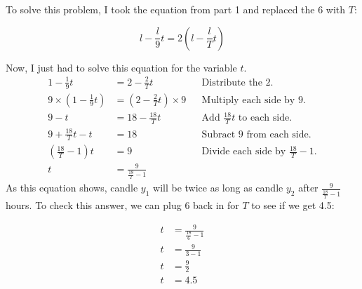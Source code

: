 \documentclass[a4paper]{article}
\begin{document}
To solve this problem, I took the equation from part 1 and replaced the 6 with $T$:

$$l-\frac{l}{9}t = 2 \left(l-\frac{l}{T}t\right)$$

Now, I just had to solve this equation for the variable $t$.
\begin{align*}
1-\frac{1}{9}t &= 2-\frac{2}{T}t &&\text{Distribute the 2.}\\
9\times\left(1-\frac{1}{9}t\right) &= \left(2-\frac{2}{T}t\right)\times9 &&\text{Multiply each side by 9.}\\ 
9-t &= 18-\frac{18}{T}t &&\text{Add $\frac{18}{T}t$ to each side.}\\
9+\frac{18}{T}t -t&= 18 &&\text{Subract 9 from each side.}\\
\left(\frac{18}{T}-1\right)t&=9 &&\text{Divide each side by $\frac{18}{T}-1$.}\\
t&=\frac{9}{\frac{18}{T}-1} 
\end{align*}
As this equation shows, candle $y_{1}$ will be twice as long as candle $y_{2}$ after $\frac{9}{\frac{18}{T}-1}$ hours.
To check this answer, we can plug 6 back in for $T$ to see if we get 4.5:

\begin{align*}
t&=\frac{9}{\frac{18}{6}-1}\\
t&=\frac{9}{3-1}\\
t&=\frac{9}{2}\\
t&=4.5
\end{align*}
\end{document}
